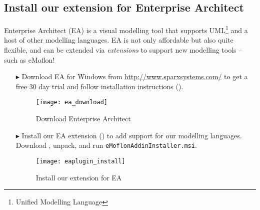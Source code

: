 \newpage

\genHeader
\subsection{Install our extension for Enterprise Architect}

Enterprise Architect (EA) is a visual modelling tool that supports UML\footnote{Unified Modelling Language} and a host of other modelling languages.
EA is not only affordable but also quite flexible, and can be extended via \emph{extensions} to support new modelling tools -- such as eMoflon!

\begin{itemize}
\item[$\blacktriangleright$] Download\hypertarget{installEA vis}{} EA for Windows from \url{http://www.sparxsystems.com/} to get a free 30 day trial and follow
installation instructions ().

\begin{figure}[htbp]
	\centering
  	\texttt{[image: ea\_download]}
	\caption{Download Enterprise Architect}
	\label{enterpriseArchitextHomepage}
\end{figure} 

\item[$\blacktriangleright$] Install our EA extension () to add support for our modelling languages.
Download \eMoflonEAAddin, unpack, and run \texttt{eMoflon\-Addin\-Installer.msi}.

\begin{figure}[htbp]
	\centering
  \texttt{[image: eaplugin\_install]}
	\caption{Install our extension for EA}
	\label{eaPluginWizard}
\end{figure}
\end{itemize}
